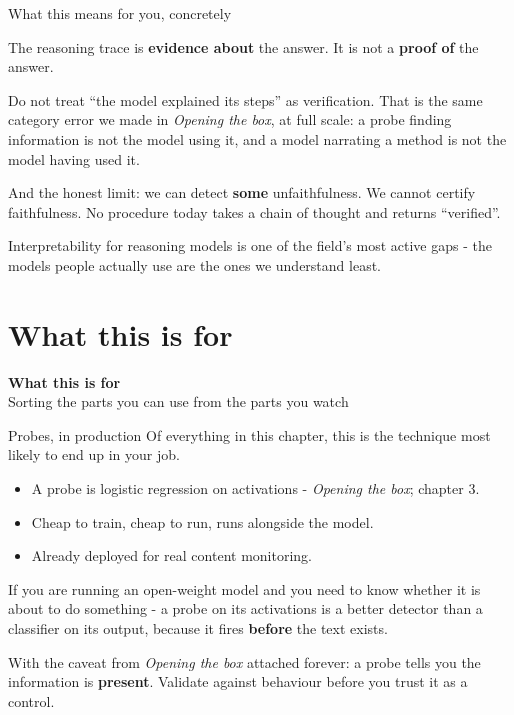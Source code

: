 \documentclass[aspectratio=169]{beamer}
\newcommand{\keybox}[1]{%
  \begin{tcolorbox}[colback=armblue!8, colframe=armblue, boxrule=0.6pt, arc=2pt]
  #1
  \end{tcolorbox}}
\newcommand{\takebox}[1]{%
  \begin{tcolorbox}[colback=paramgreen!8, colframe=paramgreen, boxrule=0.6pt, arc=2pt]
  #1
  \end{tcolorbox}}
\newcommand{\watchbox}[1]{%
  \begin{tcolorbox}[colback=armorange!12, colframe=armorange, boxrule=0.6pt, arc=2pt]
  #1
  \end{tcolorbox}}
\newcommand{\sectiontransition}[2]{%
  \begin{frame}[plain]
    \vfill
    \begin{center}
      {\Huge\bfseries\color{popblue} #1}\\[1.1em]
      {\large #2}
    \end{center}
    \vfill
  \end{frame}}
\begin{document}
\begin{frame}{What this means for you, concretely}
  \vspace{0.9em}
  \takebox{The reasoning trace is \textbf{evidence about} the answer. It is not a
  \textbf{proof of} the answer.}

  \vspace{1.0em}
  Do not treat ``the model explained its steps'' as verification. That is the same category error
  we made in \emph{Opening the box}, at full scale: a probe finding information is not the model using it, and
  a model narrating a method is not the model having used it.

  \vspace{0.7em}
  \watchbox{\small And the honest limit: we can detect \textbf{some} unfaithfulness. We cannot
  certify faithfulness. No procedure today takes a chain of thought and returns ``verified''.}

  \vspace{0.3em}
  {\footnotesize Interpretability for reasoning models is one of the field's most active gaps -
  the models people actually use are the ones we understand least.}
\end{frame}

\section{What this is for}
\sectiontransition{What this is for}{Sorting the parts you can use from the parts you watch}

\begin{frame}{Probes, in production}
  \vspace{0.8em}
  Of everything in this chapter, this is the technique most likely to end up in your job.

  \vspace{0.7em}
  \begin{itemize}
    \item A probe is logistic regression on activations - \emph{Opening the box}; chapter 3.
    \item Cheap to train, cheap to run, runs alongside the model.
    \item Already deployed for real content monitoring.
  \end{itemize}

  \vspace{0.9em}
  \keybox{If you are running an open-weight model and you need to know whether it is about to do
  something - a probe on its activations is a better detector than a classifier on its output,
  because it fires \textbf{before} the text exists.}

  \vspace{0.6em}
  \watchbox{With the caveat from \emph{Opening the box} attached forever: a probe tells you the information is
  \textbf{present}. Validate against behaviour before you trust it as a control.}
\end{frame}
\end{document}
